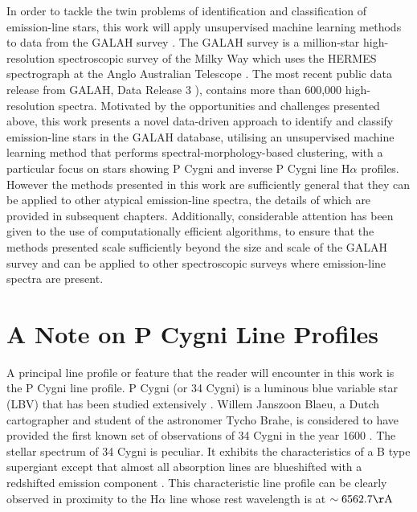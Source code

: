 In order to tackle the twin problems of identification and classification of emission-line stars, this work will apply unsupervised machine learning methods to data from the GALAH survey \citep{buder2021galah+}. The GALAH survey is a million-star high-resolution spectroscopic survey of the Milky Way which uses the HERMES spectrograph at the Anglo Australian Telescope \citep{de2015galah}. The most recent public data release from GALAH, Data Release 3 \citep[DR3;][]{buder2021galah+}), contains more than 600,000 high-resolution spectra. Motivated by the opportunities and challenges presented above, this work presents a novel data-driven approach to identify and classify emission-line stars in the GALAH database, utilising an unsupervised machine learning method that performs spectral-morphology-based clustering, with a particular focus on stars showing P Cygni and inverse P Cygni line H$\alpha$ profiles. However the methods presented in this work are sufficiently general that they can be applied to other atypical emission-line spectra, the details of which are provided in subsequent chapters. Additionally, considerable attention has been given to the use of computationally efficient algorithms, to ensure that the methods presented scale sufficiently beyond the size and scale of the GALAH survey and can be applied to other spectroscopic surveys where emission-line spectra are present. 

\section{A Note on P Cygni Line Profiles}

A principal line profile or feature that the reader will encounter in this work is the P Cygni line profile. P Cygni (or 34 Cygni) is a luminous blue variable star (LBV) that has been studied extensively \citep{1953PDAO....9....1B, hutchings1969expanding, elliott20225, underhill1966supergiants, mizumoto2018newly}. Willem Janszoon Blaeu, a Dutch cartographer and student of the astronomer Tycho Brahe, is considered to have provided the first known set of observations of 34 Cygni in the year 1600 \citep{de2001p}. The stellar spectrum of 34 Cygni is peculiar. It exhibits the characteristics of a B type supergiant except that almost all absorption lines are blueshifted with a redshifted emission component \citep{hutchings1969expanding}. This characteristic line profile can be clearly observed in proximity to the H$\alpha$ line whose rest wavelength is at $\sim 6562.7 {\rm \AA}$ \citep{zhang2021catalog, traven2015gaia}

